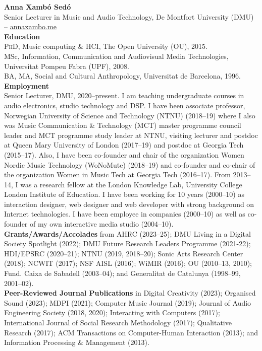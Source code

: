\documentclass[10pt, a4paper]{article}
\begin{document}

{\textbf{Anna Xambó Sedó}}\\ 
Senior Lecturer in Music and Audio Technology, De Montfort University (DMU) -- \href{http://annaxambo.me/}{annaxambo.me}\\

{\textbf{Education}}\\
\textsc{PhD}, Music computing \& HCI, The Open University (OU), 2015.\\
MSc, Information, Communication and Audiovisual Media Technologies, Universitat Pompeu Fabra (UPF), 2008.\\
BA, MA, Social and Cultural Anthropology, Universitat de Barcelona, 1996.\\

{\textbf{Employment}}\\
Senior Lecturer, DMU, 2020--present. I am teaching undergraduate courses in audio electronics, studio technology and DSP. 
I have been associate professor, Norwegian University of Science and Technology (NTNU) (2018--19) where I also was Music Communication \& Technology (MCT) master programme council leader and MCT programme study leader at NTNU, visiting lecturer and postdoc at Queen Mary University of London (2017--19) and postdoc at Georgia Tech (2015--17). Also, I have been co-founder and chair of the organization Women Nordic Music Technology (WoNoMute) (2018--19) and co-founder and co-chair of the organization Women in Music Tech at Georgia Tech (2016--17). From 2013--14, I was a research fellow at the London Knowledge Lab, University College London Institute of Education.
I have been working for 10 years (2000--10) as interaction designer, web designer and web developer with strong background on Internet technologies. I have been employee in companies (2000--10) as well as co-founder of my own interactive media studio (2004--10).\\

{\textbf{Grants/Awards/Accolades}} from AHRC (2023--25); DMU Living in a Digital Society Spotlight (2022); DMU Future Research Leaders Programme (2021-22); HDI/EPSRC (2020--21); NTNU (2019, 2018--20); Sonic Arts Research Center (2018); NCWIT (2017); NSF AISL (2016); WiMIR (2016); OU (2010--13, 2010); Fund. Caixa de Sabadell (2003--04); and Generalitat de Catalunya (1998--99, 2001--02).\\

{\textbf{Peer-Reviewed Journal Publications}} in Digital Creativity (2023); Organised Sound (2023); MDPI (2021); Computer Music Journal (2019); Journal of Audio Engineering Society (2018, 2020); Interacting with Computers (2017); International Journal of Social Research Methodology (2017); Qualitative Research (2017); ACM Transactions on Computer-Human Interaction (2013); and Information Processing \& Management (2013).\\
\end{document}
